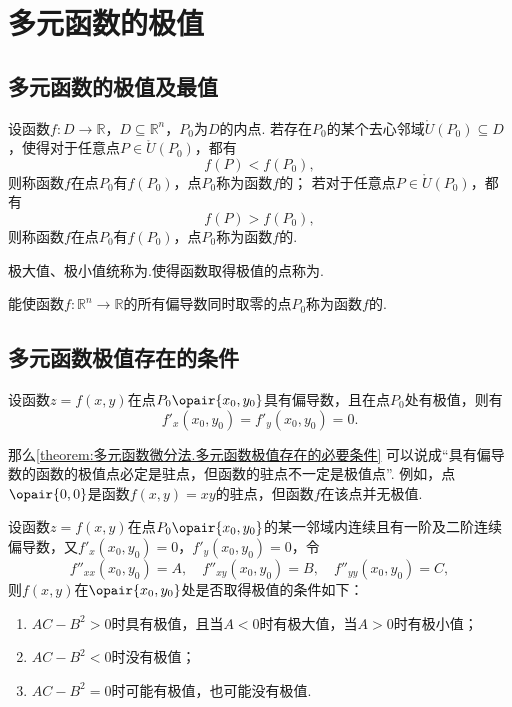 \section{多元函数的极值}
\subsection{多元函数的极值及最值}
\begin{definition}
设函数\(f\colon D \to \mathbb{R}\)，\(D \subseteq \mathbb{R}^n\)，\(P_0\)为\(D\)的内点.
若存在\(P_0\)的某个去心邻域\(\mathring{U}(P_0) \subseteq D\)，使得对于任意点\(P \in \mathring{U}(P_0)\)，都有\[
f(P) < f(P_0),
\]则称函数\(f\)在点\(P_0\)有\(f(P_0)\)，点\(P_0\)称为函数\(f\)的；
若对于任意点\(P \in \mathring{U}(P_0)\)，都有\[
f(P) > f(P_0),
\]则称函数\(f\)在点\(P_0\)有\(f(P_0)\)，点\(P_0\)称为函数\(f\)的.

极大值、极小值统称为.使得函数取得极值的点称为.
\end{definition}

\begin{definition}[驻点]
能使函数\(f\colon \mathbb{R}^n \to \mathbb{R}\)的所有偏导数同时取零的点\(P_0\)称为函数\(f\)的.
\end{definition}

\subsection{多元函数极值存在的条件}
\begin{theorem}[必要条件]\label{theorem:多元函数微分法.多元函数极值存在的必要条件}
设函数\(z=f(x,y)\)在点\(P_0\opair{x_0,y_0}\)具有偏导数，且在点\(P_0\)处有极值，则有\[
f'_x(x_0,y_0) = f'_y(x_0,y_0) = 0.
\]
\end{theorem}

那么\cref{theorem:多元函数微分法.多元函数极值存在的必要条件} 可以说成“具有偏导数的函数的极值点必定是驻点，但函数的驻点不一定是极值点”.
例如，点\(\opair{0,0}\)是函数\(f(x,y) = xy\)的驻点，但函数\(f\)在该点并无极值.

\begin{theorem}[充分条件]\label{theorem:多元函数微分法.多元函数极值存在的充分条件}
设函数\(z=f(x,y)\)在点\(P_0\opair{x_0,y_0}\)的某一邻域内连续且有一阶及二阶连续偏导数，又\(f'_x(x_0,y_0)=0\)，\(f'_y(x_0,y_0)=0\)，令\[
f''_{xx}(x_0,y_0)=A, \quad
f''_{xy}(x_0,y_0)=B, \quad
f''_{yy}(x_0,y_0)=C,
\]则\(f(x,y)\)在\(\opair{x_0,y_0}\)处是否取得极值的条件如下：
\begin{enumerate}
\item \(AC-B^2>0\)时具有极值，且当\(A<0\)时有极大值，当\(A>0\)时有极小值；
\item \(AC-B^2<0\)时没有极值；
\item \(AC-B^2=0\)时可能有极值，也可能没有极值.
\end{enumerate}
\end{theorem}

